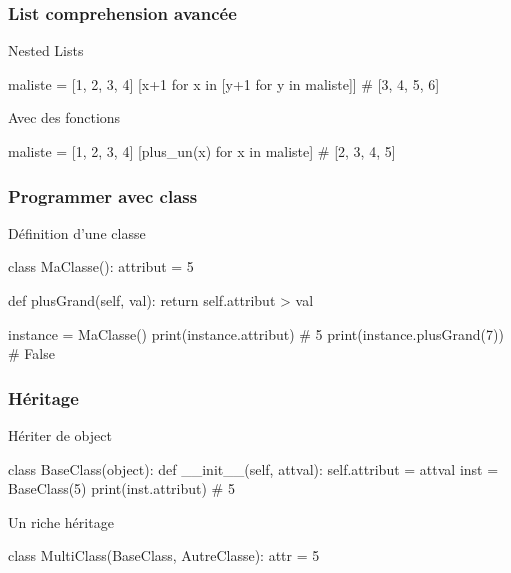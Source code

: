 \documentclass{beamer}
\begin{document}
\begin{frame}[fragile]
  \frametitle{List comprehension avancée}

  \begin{block}{Nested Lists}
    \begin{python}
maliste = [1, 2, 3, 4]
[x+1 for x in [y+1 for y in maliste]] 
# [3, 4, 5, 6]
    \end{python}
  \end{block}

  \pause

  \begin{block}{Avec des fonctions}
    \begin{python}
maliste = [1, 2, 3, 4]
[plus_un(x) for x in maliste] # [2, 3, 4, 5]
    \end{python}
  \end{block}

\end{frame}

\begin{frame}[fragile]
  \frametitle{Programmer avec class}

  \begin{block}{Définition d'une classe}
    \begin{python}
class MaClasse():
  attribut = 5

  def plusGrand(self, val):
    return self.attribut > val

instance = MaClasse()
print(instance.attribut) # 5
print(instance.plusGrand(7)) # False
    \end{python}
  \end{block}
\end{frame}


\begin{frame}[fragile]
  \frametitle{Héritage}

  \begin{block}{Hériter de object}
    \begin{python}
class BaseClass(object):
  def __init__(self, attval):
    self.attribut = attval
inst = BaseClass(5)
print(inst.attribut) # 5
    \end{python}

  \end{block}

  \pause

  \begin{block}{Un riche héritage}
  \begin{python}
class MultiClass(BaseClass, AutreClasse):
  attr = 5
  \end{python}
    
  \end{block}
\end{frame}
\end{document}
